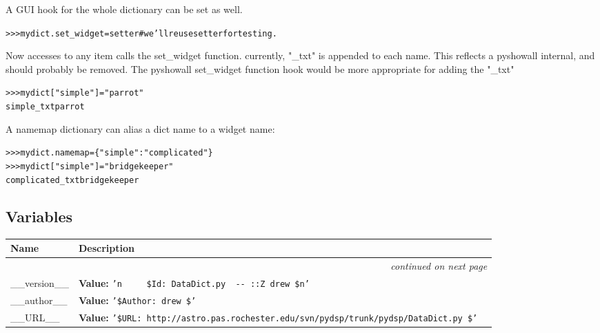 A GUI hook for the whole dictionary can be set as well.

\begin{alltt}
{\textgreater}{\textgreater}{\textgreater} mydict.set\_widget = setter \# we'll reuse setter for testing.\end{alltt}

Now accesses to any item calls the set\_widget function.  currently, 
"\_txt" is appended to each name. This reflects a pyshowall internal, and 
should probably be removed. The pyshowall set\_widget function hook would 
be more appropriate for adding the "\_txt"

\begin{alltt}
{\textgreater}{\textgreater}{\textgreater} mydict["simple"] = "parrot"
simple\_txt parrot\end{alltt}

A namemap dictionary can alias a dict name to a widget name:

\begin{alltt}
{\textgreater}{\textgreater}{\textgreater} mydict.namemap = \{"simple":"complicated"\}
{\textgreater}{\textgreater}{\textgreater} mydict["simple"] = "bridgekeeper"
complicated\_txt bridgekeeper\end{alltt}



  \subsection{Variables}

\begin{longtable}{|p{}|p{}|l}
\cline{1-2}
\cline{1-2} \centering \textbf{Name} & \centering \textbf{Description}& \\
\cline{1-2}
\endhead\cline{1-2}\multicolumn{3}{r}{\small\textit{continued on next page}}\\\endfoot\cline{1-2}
\endlastfoot\raggedright \_\-\_\-v\-e\-r\-s\-i\-o\-n\-\_\-\_\- & \textbf{Value:} 
{\tt '\-{\textbackslash}\-n\-~\-~\-~\-~\-~\-\$\-I\-d\-:\-~\-D\-a\-t\-a\-D\-i\-c\-t\-.\-p\-y\-~\-3\-9\-9\-~\-2\-0\-0\-6\--\-0\-6\--\-0\-4\-~\-2\-0\-:\-0\-2\-:\-1\-7\-Z\-~\-d\-r\-e\-w\-~\-\$\-{\textbackslash}\-n\-'\-}&\\
\cline{1-2}
\raggedright \_\-\_\-a\-u\-t\-h\-o\-r\-\_\-\_\- & \textbf{Value:} 
{\tt '\-\$\-A\-u\-t\-h\-o\-r\-:\-~\-d\-r\-e\-w\-~\-\$\-'\-}&\\
\cline{1-2}
\raggedright \_\-\_\-U\-R\-L\-\_\-\_\- & \textbf{Value:} 
{\tt '\-\$\-U\-R\-L\-:\-~\-h\-t\-t\-p\-:\-/\-/\-a\-s\-t\-r\-o\-.\-p\-a\-s\-.\-r\-o\-c\-h\-e\-s\-t\-e\-r\-.\-e\-d\-u\-/\-s\-v\-n\-/\-p\-y\-d\-s\-p\-/\-t\-r\-u\-n\-k\-/\-p\-y\-d\-s\-p\-/\-D\-a\-t\-a\-D\-i\-c\-t\-.\-p\-y\-~\-\$\-'\-}&\\
\cline{1-2}
\end{longtable}


